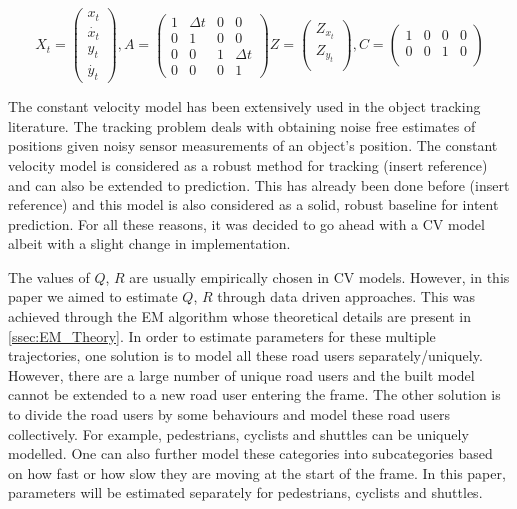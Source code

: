 \documentclass{article}
\begin{document}
$$X_t=\begin{pmatrix}x_t 
\\ \dot{x_t} 
\\ y_t 
\\ \dot{y_t} 
\end{pmatrix}, 
A=\begin{pmatrix}1 & \Delta t & 0 & 0 
\\ 0 & 1 & 0 & 0 
\\ 0 & 0 & 1 &\Delta t
\\ 0 & 0 & 0 & 1 
\end{pmatrix}
Z=\begin{pmatrix}
Z_{x_{t}}\\
Z_{y_{t}}\\
\end{pmatrix}, 
C=\begin{pmatrix} 1 & 0 & 0 & 0\\
0 & 0 & 1 & 0\\
\end{pmatrix}
$$

The constant velocity model has been extensively used in the object tracking literature. The tracking problem deals with obtaining noise free estimates of positions given noisy sensor measurements of an object's position. The constant velocity model is considered as a robust method for tracking (insert reference) and can also be extended to prediction. This has already been done before (insert reference) and this model is also considered as a solid, robust baseline for intent prediction. For all these reasons, it was decided to go ahead with a CV model albeit with a slight change in implementation. 

The values of $Q$, $R$ are usually empirically chosen in CV models. However, in this paper we aimed to estimate $Q$, $R$ through data driven approaches. This was achieved through the EM algorithm whose theoretical details are present in \ref{ssec:EM_Theory}. In order to estimate parameters for these multiple trajectories, one solution is to model all these road users separately/uniquely. However, there are a large number of unique road users and the built model cannot be extended to a new road user entering the frame. The other solution is to divide the road users by some behaviours and model these road users collectively. For example, pedestrians, cyclists and shuttles can be uniquely modelled. One can also further model these categories into subcategories based on how fast or how slow they are moving at the start of the frame. In this paper, parameters will be estimated separately for pedestrians, cyclists and shuttles.
\end{document}
